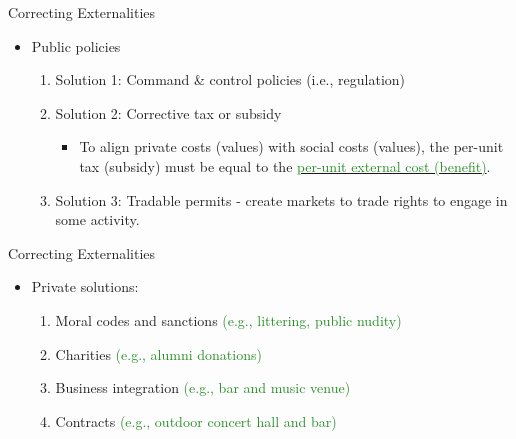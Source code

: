 \documentclass[xcolor={dvipsnames},pdf, hyperref={colorlinks=true, citecolor=ForestGreen, linkcolor=BlueViolet, urlcolor=Magenta}]{beamer}
\newcommand{\ddp}[1]{{\textcolor{ForestGreen}{#1}}}
\newcommand{\dd}[1]{{\underline{\textcolor{ForestGreen}{#1}}}}
\begin{document}
\begin{frame}{Correcting Externalities}
\begin{itemize}
	\item Public policies
	\begin{enumerate}
		\item Solution 1: Command \& control policies (i.e., regulation)
		\item Solution 2: Corrective tax or subsidy
		\begin{itemize} 
			\item To align private costs (values) with social costs (values), the per-unit tax (subsidy) must be equal to the \dd{per-unit external cost (benefit)}.
		\end{itemize}
		\item Solution 3: Tradable permits - create markets to trade rights to engage in some activity.
	\end{enumerate}
\end{itemize}
	
	
\end{frame}

\begin{frame}{Correcting Externalities}
	
\begin{itemize}
	\item Private solutions:
	\begin{enumerate}
		\item Moral codes and sanctions \ddp{(e.g., littering, public nudity)}
		\item Charities \ddp{(e.g., alumni donations)}
		\item Business integration \ddp{(e.g., bar and music venue)}
		\item Contracts \ddp{(e.g., outdoor concert hall and bar)}
	\end{enumerate}
\end{itemize}
\end{frame}
\end{document}
